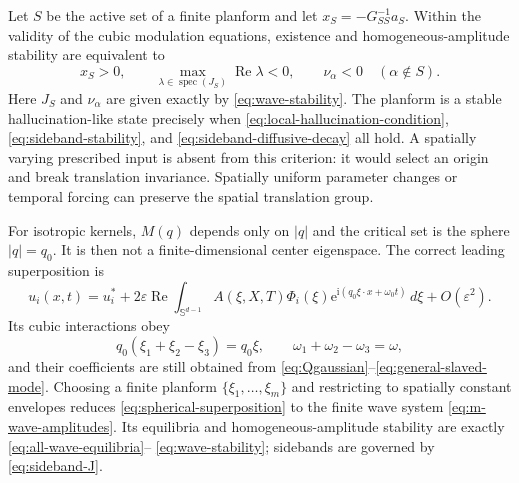 \documentclass[11pt]{article}
\newcommand{\ii}{\mathrm{i}}
\newcommand{\ee}{\mathrm{e}}
\newcommand{\RePart}{\operatorname{Re}}
\begin{document}
Let $S$ be the active set of a finite planform and let
$x_S=-G_{SS}^{-1}a_S$.  Within the validity of the cubic modulation
equations, existence and homogeneous-amplitude stability are equivalent to
\begin{equation}
 x_S>0,
 \qquad
 \max_{\lambda\in\operatorname{spec}(J_S)}\RePart\lambda<0,
 \qquad
 \nu_\alpha<0\quad(\alpha\notin S).
 \label{eq:local-hallucination-condition}
\end{equation}
Here $J_S$ and $\nu_\alpha$ are given exactly by
\eqref{eq:wave-stability}.  The planform is a stable hallucination-like state
precisely when 
\eqref{eq:local-hallucination-condition},
\eqref{eq:sideband-stability}, and
\eqref{eq:sideband-diffusive-decay} all hold.  A spatially varying prescribed
input is absent from this criterion: it would select an origin and break
translation invariance.  Spatially uniform parameter changes or temporal
forcing can preserve the spatial translation group.

For isotropic kernels, $M(q)$ depends only on $|q|$ and the critical set is
the sphere $|q|=q_0$.  It is then not a finite-dimensional center eigenspace.
The correct leading superposition is
\begin{equation}
 u_i(x,t)=u_i^*+2\varepsilon\RePart
 \int_{\mathbb S^{d-1}}
 A(\xi,X,T)\Phi_i(\xi)
 \ee^{\ii(q_0\xi\cdot x+\omega_0t)}\,d\xi+O(\varepsilon^2).
 \label{eq:spherical-superposition}
\end{equation}
Its cubic interactions obey
\begin{equation}
 q_0(\xi_1+\xi_2-\xi_3)=q_0\xi,\qquad
 \omega_1+\omega_2-\omega_3=\omega,
 \label{eq:spherical-resonance}
\end{equation}
and their coefficients are still obtained from
\eqref{eq:Qgaussian}--\eqref{eq:general-slaved-mode}.  Choosing a finite
planform $\{\xi_1,\ldots,\xi_m\}$ and restricting to spatially constant
envelopes reduces
\eqref{eq:spherical-superposition} to the finite wave system
\eqref{eq:m-wave-amplitudes}.  Its equilibria and homogeneous-amplitude
stability are exactly \eqref{eq:all-wave-equilibria}--
\eqref{eq:wave-stability}; sidebands are governed by
\eqref{eq:sideband-J}.
\end{document}
